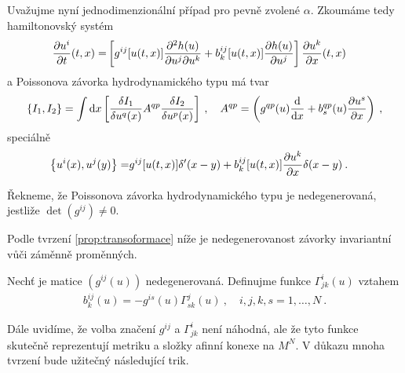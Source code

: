Uvažujme nyní jednodimenzionální případ pro pevně zvolené $\alpha$. Zkoumáme tedy hamiltonovský systém
\begin{align}
    \frac{\partial u^i}{\partial t} (t,x) =&
    \left[ g^{ij} [u(t,x)] \frac{\partial^2 h(u)}{\partial u^j \partial u^k} + b_k^{ij} [u(t,x)] \frac{\partial h(u)}{\partial u^j} \right] \frac{\partial u^k}{\partial x}(t,x) 
\end{align}
a Poissonova závorka hydrodynamického typu má tvar
\begin{align}
    \left \lbrace I_1,I_2 \right \rbrace = \int \mathrm{d} x
    \left[ \frac{\delta I_1}{\delta u^q(x)} A^{qp} \frac{\delta I_2}{\delta u^p(x)} \right] \:, \quad A^{qp} = \left( g^{qp}(u) \frac{\mathrm{d}}{\mathrm{d}x} + b^{qp}_s(u) \frac{\partial u^s}{\partial x} \right) \:,
\end{align}
speciálně
\begin{align}
    \left \lbrace u^i(x), u^j(y) \right \rbrace =& g^{ij} [u(t,x)] \delta'(x-y) + b_k^{ij} [u(t,x)] \frac{\partial u^k}{\partial x} \delta(x-y) \:. \label{eq:Poisson1D}
\end{align}

\begin{definition}
    Řekneme, že Poissonova závorka hydrodynamického typu je nedegenerovaná, jestliže $\det(g^{ij}) \neq 0$.
\end{definition}
Podle tvrzení \vref{prop:transoformace} níže je nedegenerovanost závorky invariantní vůči záměnně proměnných.

\begin{definition}
    Nechť je matice $(g^{ij}(u))$ nedegenerovaná. Definujme funkce $\Gamma^{i}_{jk}(u)$ vztahem
        \begin{align}
            b_k^{ij}(u) = -g^{is}(u) \Gamma^j_{sk}(u) \:, \quad i,j,k,s=1,\dots,N \:. \label{eq:definice-Gamma}
        \end{align}
\end{definition}

Dále uvidíme, že volba značení $g^{ij}$ a $\Gamma^{i}_{jk}$ není náhodná, ale že tyto funkce skutečně reprezentují metriku a složky afinní konexe na $M^N$. V důkazu mnoha tvrzení bude užitečný následující trik.

